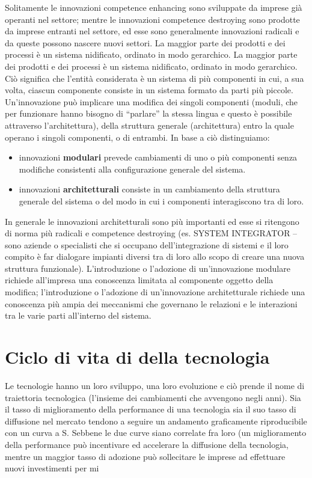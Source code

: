 \documentclass{article}
\begin{document}
Solitamente le innovazioni competence enhancing sono sviluppate da imprese già operanti nel
settore; mentre le innovazioni competence destroying sono prodotte da imprese entranti nel
settore, ed esse sono generalmente innovazioni radicali e da queste possono nascere nuovi settori.
La maggior parte dei prodotti e dei processi è un sistema nidificato, ordinato in modo gerarchico.
La maggior parte dei prodotti e dei processi è un sistema nidificato, ordinato in modo gerarchico.
Ciò significa che l’entità considerata è un sistema di più componenti in cui, a sua volta, ciascun
componente consiste in un sistema formato da parti più piccole. Un’innovazione può implicare
una modifica dei singoli componenti (moduli, che per funzionare hanno bisogno di “parlare” la
stessa lingua e questo è possibile attraverso l’architettura), della struttura generale (architettura)
entro la quale operano i singoli componenti, o di entrambi. In base a ciò distinguiamo:
\begin{itemize}
	\item  innovazioni \textbf{modulari} prevede cambiamenti di uno o più componenti senza modifiche
	consistenti alla configurazione generale del sistema.
	\item innovazioni \textbf{architetturali} consiste in un cambiamento della struttura generale del
	sistema o del modo in cui i componenti interagiscono tra di loro.
\end{itemize}
In generale le innovazioni architetturali sono più importanti ed esse si ritengono di norma più
radicali e competence destroying (es. SYSTEM INTEGRATOR – sono aziende o specialisti che si
occupano dell’integrazione di sistemi e il loro compito è far dialogare impianti diversi tra di loro
allo scopo di creare una nuova struttura funzionale).
L’introduzione o l’adozione di un’innovazione modulare richiede all’impresa una conoscenza
limitata al componente oggetto della modifica; l’introduzione o l’adozione di un’innovazione
architetturale richiede una conoscenza più ampia dei meccanismi che governano le relazioni e le
interazioni tra le varie parti all’interno del sistema.

\section{Ciclo di vita di della tecnologia}
Le tecnologie hanno un loro sviluppo, una loro evoluzione e ciò prende il nome di traiettoria
tecnologica (l’insieme dei cambiamenti che avvengono negli anni).
Sia il tasso di miglioramento della performance di una tecnologia sia il suo tasso di diffusione nel
mercato tendono a seguire un andamento graficamente riproducibile con un curva a S.
Sebbene le due curve siano correlate fra loro (un miglioramento della performance può
incentivare ed accelerare la diffusione della tecnologia, mentre un maggior tasso di adozione può
sollecitare le imprese ad effettuare nuovi investimenti per mi
\end{document}
